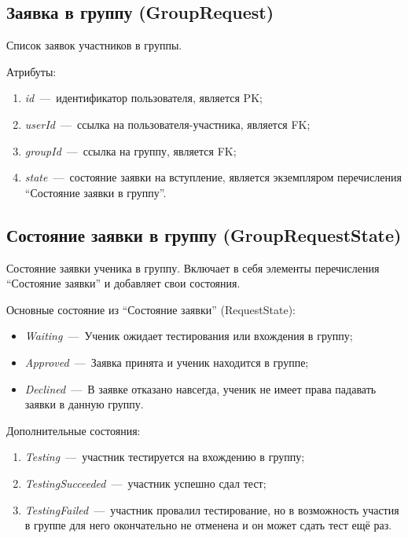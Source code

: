 \documentclass[14pt]{article}
\begin{document}
\subsection{Заявка в группу (GroupRequest)}

Список заявок участников в группы.

Атрибуты:
\begin{enumerate}
	\item \emph{id}~---~идентификатор пользователя, является PK; 
	\item \emph{userId}~---~ссылка на пользователя-участника, является FK;
	\item \emph{groupId}~---~ссылка на группу, является FK;
	\item \emph{state}~---~состояние заявки на вступление, является экземпляром перечисления ``Состояние заявки в группу''.
\end{enumerate}


\subsection{Состояние заявки в группу (GroupRequestState)}

Состояние заявки ученика в группу. Включает в себя элементы перечисления ``Состояние заявки'' и добавляет свои состояния.

Основные состояние из ``Состояние заявки'' (RequestState):

\begin{itemize}
	\item \emph{Waiting}~---~Ученик ожидает тестирования или вхождения в группу;
	\item \emph{Approved}~---~Заявка принята и ученик находится в группе;
	\item \emph{Declined}~---~В заявке отказано навсегда, ученик не имеет права падавать заявки в данную группу.
\end{itemize}

Дополнительные состояния:
\begin{enumerate}
	\item \emph{Testing}~---~участник тестируется на вхождению в группу;
	\item \emph{TestingSucceeded}~---~участник успешно сдал тест;
	\item \emph{TestingFailed}~---~участник провалил тестирование, но в возможность участия в группе для него окончательно не отменена и он может сдать тест ещё раз.
\end{enumerate}
\end{document}
